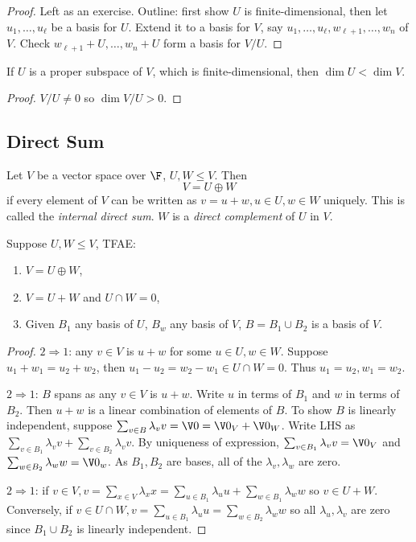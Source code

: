 \documentclass[a4paper]{article}
\theoremstyle{definition}
\begin{document}
\begin{proof}
  Left as an exercise. Outline: first show \(U\) is finite-dimensional, then let \(u_1,\ldots,u_\ell\) be a basis for \(U\). Extend it to a basis for \(V\), say \(u_1,\ldots,u_\ell,w_{\ell+1},\ldots,w_n\) of \(V\). Check \(w_{\ell+1}+U,\ldots,w_n+U\) form a basis for \(V/U\).
\end{proof}

\begin{cor}
  If \(U\) is a proper subspace of \(V\), which is finite-dimensional, then \(\dim U < \dim V\).
\end{cor}

\begin{proof}
  \(V/U \neq 0\) so \(\dim V/U > 0\).
\end{proof}

\subsection{Direct Sum}

\begin{defi}
  Let \(V\) be a vector space over \(\F\), \(U, W\leq V\). Then
  \[
V = U \oplus W
  \]
  if every element of \(V\) can be written as \(v=u+w, u\in U, w\in W\) uniquely. This is called the \emph{internal direct sum}. \(W\) is a \emph{direct complement} of \(U\) in \(V\).
\end{defi}

\begin{lem}
  Suppose \(U,W\leq V\), TFAE:
  \begin{enumerate}
  \item \(V = U \oplus W\),
  \item \(V=U+W\) and \(U\cap W = 0\),
  \item Given \(B_1\) any basis of \(U\), \(B_w\) any basis of \(V\), \(B=B_1\cup B_2\) is a basis of \(V\).
  \end{enumerate}
\end{lem}

\begin{proof}
  \(2 \Rightarrow 1\): any \(v\in V\) is \(u+w\) for some \(u\in U, w\in W\). Suppose \(u_1+w_1=u_2+w_2\), then \(u_1-u_2 = w_2-w_1 \in U\cap W = 0\). Thus \(u_1=u_2,w_1=w_2\).

  \(2 \Rightarrow 1\): \(B\) spans as any \(v\in V\) is \(u+w\). Write \(u\) in terms of \(B_1\) and \(w\) in terms of \(B_2\). Then \(u+w\) is a linear combination of elements of \(B\). To show \(B\) is linearly independent, suppose \(\sum_{v\in B} \lambda_v v = \V 0 = \V 0_V + \V 0_W\). Write LHS as \(\sum_{v\in B_1} \lambda_vv + \sum_{v\in B_2}\lambda_vv\). By uniqueness of expression, \(\sum_{v\in B_1}\lambda_vv=\V 0_V\) and \(\sum_{w\in B_2}\lambda_ww=\V 0_w\). As \(B_1, B_2\) are bases, all of the \(\lambda_v, \lambda_w\) are zero.

  \(2 \Rightarrow 1\): if \(v\in V, v=\sum_{x\in V}\lambda_xx = \sum_{u\in B_1}\lambda_uu + \sum_{w\in B_1}\lambda_ww\) so \(v\in U+W\). Conversely, if \(v\in U\cap W, v = \sum_{u\in B_1}\lambda_uu=\sum_{w\in B_2}\lambda_ww\) so all \(\lambda_u, \lambda_v\) are zero since \(B_1\cup B_2\) is linearly independent.
\end{proof}
\end{document}
